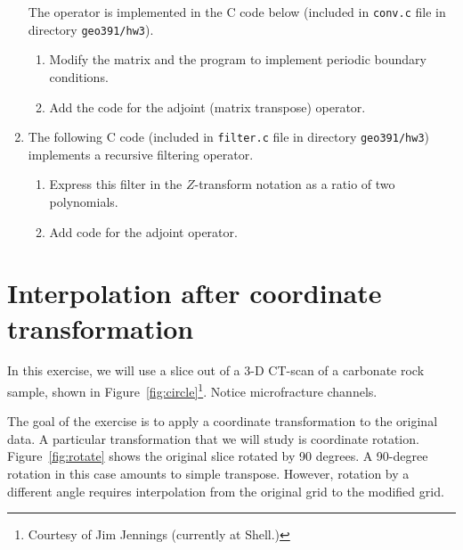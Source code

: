 \begin{enumerate}
The operator is implemented in the C code below (included
  in \texttt{conv.c} file in directory \texttt{geo391/hw3}).

\lstset{language=c,numbers=left,numberstyle=\tiny,showstringspaces=false}


\begin{enumerate}
\item Modify the matrix and the program to implement periodic boundary conditions.
\item Add the code for the adjoint (matrix transpose) operator.
\end{enumerate}

\newpage

\item The following C code (included in \texttt{filter.c} file in
  directory \texttt{geo391/hw3}) implements a recursive filtering
  operator.

\lstset{language=c,numbers=left,numberstyle=\tiny,showstringspaces=false}


\begin{enumerate}
\item Express this filter in the $Z$-transform notation as a ratio
  of two polynomials.
\item Add code for the adjoint operator.
\end{enumerate}

\end{enumerate}

\section{Interpolation after coordinate transformation}

In this exercise, we will use a slice out of a 3-D CT-scan of a
carbonate rock sample, shown in
Figure~\ref{fig:circle}\footnote{Courtesy of Jim Jennings
  (currently at Shell.)}. Notice microfracture channels.


The goal of the exercise is to apply a coordinate transformation to
the original data. A particular transformation that we will study is
coordinate rotation. Figure~\ref{fig:rotate} shows the original slice
rotated by 90 degrees. A 90-degree rotation in this case amounts to
simple transpose. However, rotation by a different angle requires
interpolation from the original grid to the modified grid.

